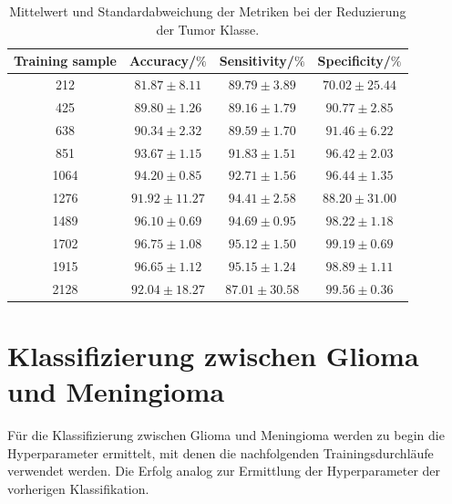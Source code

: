 \begin{table}[H]
    \centering
     {\small
        \begin{tabular}{cccc}
            \toprule
            Training sample & Accuracy/$\%$ & Sensitivity/$\%$ & Specificity/$\%$\\
            \midrule
            212  & $81.87 \pm 8.11$ & $89.79 \pm 3.89$ & $ 70.02 \pm 25.44$\\
            425  & $89.80 \pm 1.26$ & $89.16 \pm 1.79$ & $ 90.77 \pm 2.85$\\
            638  & $90.34 \pm 2.32$ & $89.59 \pm 1.70$ & $ 91.46 \pm 6.22$\\
            851  & $93.67 \pm 1.15$ & $91.83 \pm 1.51$ & $ 96.42 \pm 2.03$\\
            1064 & $94.20 \pm 0.85$ & $92.71 \pm 1.56$ & $ 96.44 \pm 1.35$\\
            1276 & $91.92 \pm 11.27$& $94.41 \pm 2.58$ & $ 88.20 \pm 31.00$\\
            1489 & $96.10 \pm 0.69$ & $94.69 \pm 0.95$ & $ 98.22 \pm 1.18$\\
            1702 & $96.75 \pm 1.08$ & $95.12 \pm 1.50$ & $ 99.19 \pm 0.69$\\
            1915 & $96.65 \pm 1.12$ & $95.15 \pm 1.24$ & $ 98.89 \pm 1.11$\\
            2128 & $92.04 \pm 18.27$& $87.01 \pm 30.58$ &$ 99.56 \pm 0.36$\\
            \bottomrule
        \end{tabular}}
  \caption{Mittelwert und Standardabweichung der Metriken bei der Reduzierung der Tumor Klasse.}
  \label{tab:red_tu}
\end{table}
\section{Klassifizierung zwischen Glioma und Meningioma}
Für die Klassifizierung zwischen Glioma und Meningioma werden zu begin die Hyperparameter ermittelt, mit denen die nachfolgenden
Trainingsdurchläufe verwendet werden. 
Die Erfolg analog zur Ermittlung der Hyperparameter der vorherigen Klassifikation.
